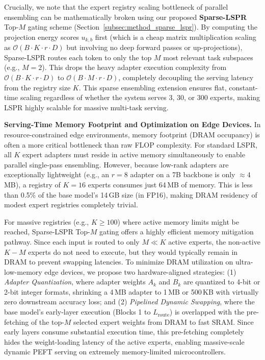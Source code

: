 Crucially, we note that the expert registry scaling bottleneck of parallel ensembling can be mathematically broken using our proposed \textbf{Sparse-LSPR} Top-$M$ gating scheme (Section~\ref{subsec:method_sparse_lspr}). By computing the projection energy scores $u_{k, b}$ first (which is a cheap matrix multiplication scaling as $\mathcal{O}(B \cdot K \cdot r \cdot D)$ but involving no deep forward passes or up-projections), Sparse-LSPR routes each token to only the top $M$ most relevant task subspaces (e.g., $M=2$). This drops the heavy adapter execution complexity from $\mathcal{O}(B \cdot K \cdot r \cdot D)$ to $\mathcal{O}(B \cdot M \cdot r \cdot D)$, completely decoupling the serving latency from the registry size $K$. This sparse ensembling extension ensures flat, constant-time scaling regardless of whether the system serves 3, 30, or 300 experts, making LSPR highly scalable for massive multi-task serving.

\textbf{Serving-Time Memory Footprint and Optimization on Edge Devices.}
In resource-constrained edge environments, memory footprint (DRAM occupancy) is often a more critical bottleneck than raw FLOP complexity. For standard LSPR, all $K$ expert adapters must reside in active memory simultaneously to enable parallel single-pass ensembling. However, because low-rank adapters are exceptionally lightweight (e.g., an $r=8$ adapter on a 7B backbone is only $\approx 4$\,MB), a registry of $K=16$ experts consumes just 64\,MB of memory. This is less than 0.5\% of the base model's 14\,GB size (in FP16), making DRAM residency of modest expert registries completely trivial.

For massive registries (e.g., $K \ge 100$) where active memory limits might be reached, Sparse-LSPR Top-$M$ gating offers a highly efficient memory mitigation pathway. Since each input is routed to only $M \ll K$ active experts, the non-active $K-M$ experts do not need to execute, but they would typically remain in DRAM to prevent swapping latencies. To minimize DRAM utilization on ultra-low-memory edge devices, we propose two hardware-aligned strategies: (1) \textit{Adapter Quantization}, where adapter weights $A_k$ and $B_k$ are quantized to 4-bit or 2-bit integer formats, shrinking a 4\,MB adapter to 1\,MB or 500\,KB with virtually zero downstream accuracy loss; and (2) \textit{Pipelined Dynamic Swapping}, where the base model's early-layer execution (Blocks 1 to $L_{\text{route}}$) is overlapped with the pre-fetching of the top-$M$ selected expert weights from DRAM to fast SRAM. Since early layers consume substantial execution time, this pre-fetching completely hides the weight-loading latency of the active experts, enabling massive-scale dynamic PEFT serving on extremely memory-limited microcontrollers.

